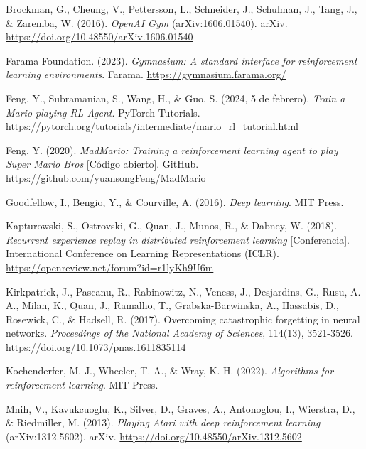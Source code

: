 \documentclass[11pt,letterpaper]{article}
\begin{document}
\begin{trivlist}

\item Brockman, G., Cheung, V., Pettersson, L., Schneider, J., Schulman, J., Tang, J., \& Zaremba, W. (2016). \textit{OpenAI Gym} (arXiv:1606.01540). arXiv. \url{https://doi.org/10.48550/arXiv.1606.01540}

\item Farama Foundation. (2023). \textit{Gymnasium: A standard interface for reinforcement learning environments}. Farama. \url{https://gymnasium.farama.org/}

\item Feng, Y., Subramanian, S., Wang, H., \& Guo, S. (2024, 5 de febrero). \textit{Train a Mario-playing RL Agent}. PyTorch Tutorials. \url{https://pytorch.org/tutorials/intermediate/mario_rl_tutorial.html}

\item Feng, Y. (2020). \textit{MadMario: Training a reinforcement learning agent to play Super Mario Bros} [Código abierto]. GitHub. \url{https://github.com/yuansongFeng/MadMario}

\item Goodfellow, I., Bengio, Y., \& Courville, A. (2016). \textit{Deep learning}. MIT Press.

\item Kapturowski, S., Ostrovski, G., Quan, J., Munos, R., \& Dabney, W. (2018). \textit{Recurrent experience replay in distributed reinforcement learning} [Conferencia]. International Conference on Learning Representations (ICLR). \url{https://openreview.net/forum?id=r1lyKh9U6m}

\item Kirkpatrick, J., Pascanu, R., Rabinowitz, N., Veness, J., Desjardins, G., Rusu, A. A., Milan, K., Quan, J., Ramalho, T., Grabska-Barwinska, A., Hassabis, D., Rosewick, C., \& Hadsell, R. (2017). Overcoming catastrophic forgetting in neural networks. \textit{Proceedings of the National Academy of Sciences}, 114(13), 3521-3526. \url{https://doi.org/10.1073/pnas.1611835114}

\item Kochenderfer, M. J., Wheeler, T. A., \& Wray, K. H. (2022). \textit{Algorithms for reinforcement learning}. MIT Press.

\item Mnih, V., Kavukcuoglu, K., Silver, D., Graves, A., Antonoglou, I., Wierstra, D., \& Riedmiller, M. (2013). \textit{Playing Atari with deep reinforcement learning} (arXiv:1312.5602). arXiv. \url{https://doi.org/10.48550/arXiv.1312.5602}


\end{trivlist}
\end{document}
